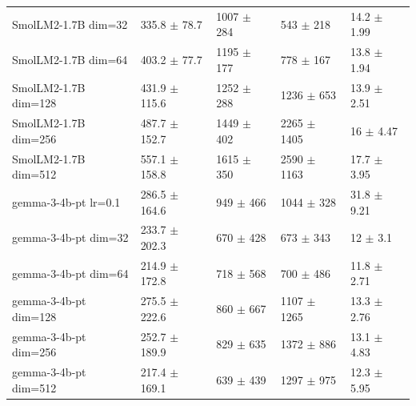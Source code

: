 \begin{tabular}{lllll}
 SmolLM2-1.7B {\small dim=32}   & 335.8 {\small $\pm$ 78.7}   & 1007 {\small $\pm$ 284}  & 543 {\small $\pm$ 218}     & 14.2 {\small $\pm$ 1.99} \\
 SmolLM2-1.7B {\small dim=64}   & 403.2 {\small $\pm$ 77.7}   & 1195 {\small $\pm$ 177}  & 778 {\small $\pm$ 167}     & 13.8 {\small $\pm$ 1.94} \\
 SmolLM2-1.7B {\small dim=128}  & 431.9 {\small $\pm$ 115.6}  & 1252 {\small $\pm$ 288}  & 1236 {\small $\pm$ 653}    & 13.9 {\small $\pm$ 2.51} \\
 SmolLM2-1.7B {\small dim=256}  & 487.7 {\small $\pm$ 152.7}  & 1449 {\small $\pm$ 402}  & 2265 {\small $\pm$ 1405}   & 16 {\small $\pm$ 4.47}   \\
 SmolLM2-1.7B {\small dim=512}  & 557.1 {\small $\pm$ 158.8}  & 1615 {\small $\pm$ 350}  & 2590 {\small $\pm$ 1163}   & 17.7 {\small $\pm$ 3.95} \\
 \midrule
 gemma-3-4b-pt {\small lr=0.1}  & 286.5 {\small $\pm$ 164.6}  & 949 {\small $\pm$ 466}   & 1044 {\small $\pm$ 328}    & 31.8 {\small $\pm$ 9.21} \\
 gemma-3-4b-pt {\small dim=32}  & 233.7 {\small $\pm$ 202.3}  & 670 {\small $\pm$ 428}   & 673 {\small $\pm$ 343}     & 12 {\small $\pm$ 3.1}    \\
 gemma-3-4b-pt {\small dim=64}  & 214.9 {\small $\pm$ 172.8}  & 718 {\small $\pm$ 568}   & 700 {\small $\pm$ 486}     & 11.8 {\small $\pm$ 2.71} \\
 gemma-3-4b-pt {\small dim=128} & 275.5 {\small $\pm$ 222.6}  & 860 {\small $\pm$ 667}   & 1107 {\small $\pm$ 1265}   & 13.3 {\small $\pm$ 2.76} \\
 gemma-3-4b-pt {\small dim=256} & 252.7 {\small $\pm$ 189.9}  & 829 {\small $\pm$ 635}   & 1372 {\small $\pm$ 886}    & 13.1 {\small $\pm$ 4.83} \\
 gemma-3-4b-pt {\small dim=512} & 217.4 {\small $\pm$ 169.1}  & 639 {\small $\pm$ 439}   & 1297 {\small $\pm$ 975}    & 12.3 {\small $\pm$ 5.95} \\
\bottomrule
\end{tabular}
